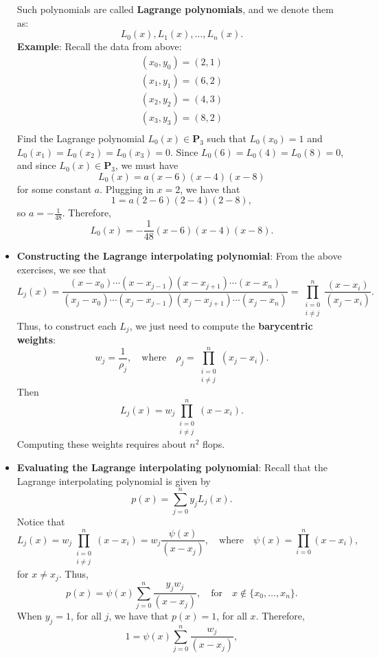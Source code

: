 \documentclass{report}
\begin{document}
\begin{itemize}
$$    $$
    Such polynomials are called \textbf{Lagrange polynomials}, and we denote them as:
    $$L_0(x), L_1(x), \ldots, L_n(x).$$
    \bigbreak \noindent 
    \textbf{Example}: Recall the data from above:
    \begin{align*}
        (x_0,y_0) = (2,1)\\
        (x_1,y_1) = (6,2)\\
        (x_2, y_2) = (4,3)\\
        (x_3, y_3) = (8,2)\\
    \end{align*}
    Find the Lagrange polynomial $L_0(x) \in \mathbf{P}_3$ such that $L_0(x_0) = 1$ and $L_0(x_1) = L_0(x_2) = L_0(x_3) = 0$.
    \bigbreak \noindent 
    Since $L_0(6)= L_0(4) = L_0(8) = 0$, and since $L_0(x) \in \mathbf{P}_3$, we must have
    $$L_0(x) = a(x-6)(x-4)(x-8)$$
    for some constant $a$.
    \bigbreak \noindent 
    Plugging in $x = 2$, we have that
    $$1 = a(2-6)(2-4)(2-8),$$
    so $a = -\frac{1}{48}$. Therefore,
    $$L_0(x) = -\frac{1}{48}(x-6)(x-4)(x-8).$$
\item \textbf{Constructing the Lagrange interpolating polynomial}:
    From the above exercises, we see that
    $$ L_j(x) = \frac{(x-x_0)\cdots(x-x_{j-1})(x-x_{j+1})\cdots(x-x_n)}{(x_j-x_0)\cdots(x_j-x_{j-1})(x_j-x_{j+1})\cdots(x_j-x_n)} 
    = 
    \prod_{\substack{i = 0 \\ i \neq j}}^n \frac{(x-x_i)}{(x_j-x_i)}.$$
    Thus, to construct each $L_j$, we just need to compute the \textbf{barycentric weights}:
    $$
    w_j = \frac{1}{\rho_j}, \quad \text{where} \quad \rho_j = \prod_{\substack{i = 0 \\ i \neq j}}^n (x_j-x_i).
    $$
    Then
    $$L_j(x) = w_j \prod_{\substack{i = 0 \\ i \neq j}}^n (x-x_i).$$
    Computing these weights requires about $n^2$ flops.
\item \textbf{Evaluating the Lagrange interpolating polynomial}:
    Recall that the Lagrange interpolating polynomial is given by
    $$p(x) = \sum_{j=0}^n y_j L_j(x).$$
    Notice that
    $$L_j(x) = w_j \prod_{\substack{i = 0 \\ i \neq j}}^n (x-x_i) = w_j \frac{\psi(x)}{(x-x_j)},
    \quad \text{where} \quad \psi(x) = \prod_{i=0}^n (x-x_i),$$
    for $x \neq x_j$. Thus,
    $$p(x) = \psi(x) \sum_{j=0}^n  \frac{y_j w_j}{(x-x_j)}, \quad \text{for} \quad x \not\in \{x_0, \ldots, x_n\}.$$
    \bigbreak \noindent 
    When $y_j = 1$, for all $j$, we have that $p(x) = 1$, for all $x$. Therefore,
    $$1 = \psi(x) \sum_{j=0}^n  \frac{w_j}{(x-x_j)},$$

\end{itemize}
\end{document}
